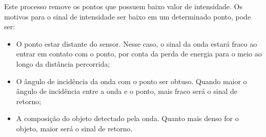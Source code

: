 Este processo remove os pontos que possuem baixo valor de intensidade. Os motivos para o sinal de intensidade ser baixo em um determinado ponto, pode ser:
    \begin{itemize}
        \item O ponto estar distante do sensor. Nesse caso, o sinal da onda estará fraco ao entrar em contato com o ponto, por conta da perda de energia para o meio ao longo da distância percorrida;
        \item O ângulo de incidência da onda com o ponto ser obtuso. Quando maior o ângulo de incidência entre a onda e o ponto, mais fraco será o sinal de retorno;
        \item A composição do objeto detectado pela onda. Quanto mais denso for o objeto, maior será o sinal de retorno.
    \end{itemize}

